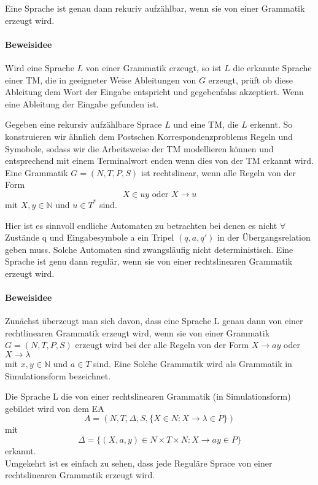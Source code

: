     Eine Sprache ist genau dann rekuriv aufzählbar, wenn sie von einer Grammatik erzeugt wird.
\paragraph*{Beweisidee} 
    Wird eine Sprache $L$ von einer Grammatik erzeugt, so ist $L$ die erkannte Sprache einer TM, die in geeigneter Weise Ableitungen von $G$ erzeugt, prüft ob diese Ableitung dem Wort der Eingabe entspricht und gegebenfalss akzeptiert. Wenn eine Ableitung der Eingabe gefunden ist.\par\bigskip
    Gegeben eine rekursiv aufzählbare Sprace $L$ und eine TM, die $L$ erkennt. So konstruieren wir ähnlich dem Postschen Korrespondenzproblems Regeln und Symobole, sodass wir die Arbeitsweise der TM modellieren können und entsprechend mit einem Terminalwort enden wenn dies von der TM erkannt wird.
    Eine Grammatik \(G=(N,T,P,S)\) ist rechtslinear, wenn alle Regeln von der Form 
    \[X\in uy \text{ oder } X\to u\]
    mit \(X,y\in\mathbb{N}\) und \(u\in T^*\) sind.\par\bigskip 
    Hier ist es sinnvoll endliche Automaten zu betrachten bei denen es nicht \(\forall\) Zustände q und Eingabesymbole a ein Tripel \((q,a,q')\) in der Übergangsrelation geben muss. Solche Automaten sind zwangsläufig nicht deterministisch.
    Eine Sprache ist genu dann regulär, wenn sie von einer rechtslinearen Grammatik erzeugt wird.
\paragraph*{Beweisidee}
    Zunächst überzeugt man sich davon, dass eine Sprache L genau dann von einer rechtlinearen Grammatik erzeugt wird, wenn sie von einer Grammatik \(G=(N,T,P,S)\) erzeugt wird bei der alle Regeln von der Form \(X\to ay\) oder \(X\to \lambda\)\\
    mit \(x,y\in\mathbb{N}\) und \(a\in T\) sind. Eine Solche Grammatik wird als Grammatik in Simulationsform bezeichnet.\par\bigskip
    Die Sprache L die von einer rechtslinearen Grammatik (in Simulationsform) gebildet wird von dem EA 
    \[
        A=(N,T,\Delta,S,\{X\in N: X\to \lambda\in P\})
    \]
    mit 
    \[
        \Delta=\{(X,a,y)\in N\times T\times N:X\to ay\in P\}
    \]
    erkannt.\\
    Umgekehrt ist es einfach zu sehen, dass jede Reguläre Sprace von einer rechtslinearen Grammatik erzeugt wird. 

